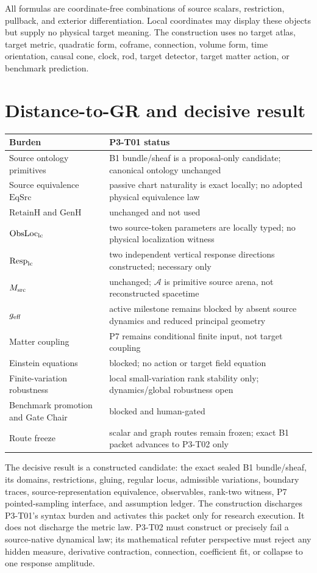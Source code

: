 \documentclass[11pt]{article}
\newcommand{\A}{\mathcal A}
\begin{document}
All formulas are coordinate-free combinations of source scalars, restriction,
pullback, and exterior differentiation.  Local coordinates may display these
objects but supply no physical target meaning.  The construction uses no
target atlas, target metric, quadratic form, coframe, connection, volume form,
time orientation, causal cone, clock, rod, target detector, target matter
action, or benchmark prediction.

\section{Distance-to-GR and decisive result}

\begin{longtable}{p{}p{}}
\toprule
Burden & P3-T01 status \\
\midrule
Source ontology primitives & B1 bundle/sheaf is a proposal-only candidate; canonical ontology unchanged \\
Source equivalence $\mathrm{EqSrc}$ & passive chart naturality is exact locally; no adopted physical equivalence law \\
$\mathrm{RetainH}$ and $\mathrm{GenH}$ & unchanged and not used \\
$\mathrm{ObsLoc}_{\rm lc}$ & two source-token parameters are locally typed; no physical localization witness \\
$\mathrm{Resp}_{\rm lc}$ & two independent vertical response directions constructed; necessary only \\
$M_{\rm src}$ & unchanged; $\A$ is primitive source arena, not reconstructed spacetime \\
$g_{\rm eff}$ & active milestone remains blocked by absent source dynamics and reduced principal geometry \\
Matter coupling & P7 remains conditional finite input, not target coupling \\
Einstein equations & blocked; no action or target field equation \\
Finite-variation robustness & local small-variation rank stability only; dynamics/global robustness open \\
Benchmark promotion and Gate Chair & blocked and human-gated \\
Route freeze & scalar and graph routes remain frozen; exact B1 packet advances to P3-T02 only \\
\bottomrule
\end{longtable}

The decisive result is a constructed candidate: the exact sealed B1
bundle/sheaf, its domains, restrictions, gluing, regular locus, admissible
variations, boundary traces, source-representation equivalence, observables,
rank-two witness, P7 pointed-sampling interface, and assumption ledger.  The
construction discharges P3-T01's syntax burden and activates this packet only
for research execution.  It does not discharge the metric law.  P3-T02 must
construct or precisely fail a source-native dynamical law; its mathematical
refuter perspective must reject any hidden measure, derivative contraction,
connection, coefficient fit, or collapse to one response amplitude.
\end{document}
